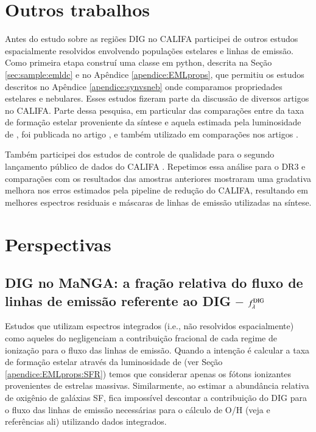\section{Outros trabalhos}
\label{sec:concl:other}

Antes do estudo sobre as regiões DIG no CALIFA participei de outros estudos espacialmente resolvidos envolvendo populações estelares e linhas de emissão. Como primeira etapa construí uma classe em {\sc python}, descrita na Seção  \ref{sec:sample:emldc} e no Apêndice \ref{apendice:EMLprops}, que permitiu os estudos descritos no Apêndice \ref{apendice:synvsneb} onde comparamos propriedades estelares e nebulares. Esses estudos fizeram parte da discussão de diversos artigos no CALIFA. Parte dessa pesquisa, em particular das comparações entre da taxa de formação estelar proveniente da síntese e aquela estimada pela luminosidade de \Ha, foi publicada no artigo \citep{GonzalezDelgado.etal.2016a}, e também utilizado em comparações nos artigos \citet{CortijoFerrero.etal.2017a, CortijoFerrero.etal.2017b, CortijoFerrero.etal.2017c}.

Também participei dos estudos de controle de qualidade para o segundo lançamento público de dados do CALIFA  \citet[DR2; ][Apêndice \ref{apendice:GBetal2015a}]{GarciaBenito.etal.2015a}. Repetimos essa análise para o DR3 e comparações com os resultados das amostras anteriores mostraram uma gradativa melhora nos erros estimados pela pipeline de redução do CALIFA, resultando em melhores espectros residuais e máscaras de linhas de emissão utilizadas na síntese.


\section{Perspectivas}
\label{sec:concl:futIFS}

\subsection{DIG no MaNGA: a fração relativa do fluxo de linhas de emissão referente ao DIG -- $f_\lambda^{\rm DIG}$}
\label{sec:concl:futIFS:DIGMaNGA}
Estudos que utilizam espectros integrados (i.e., não resolvidos espacialmente) como aqueles do \SDSS negligenciam a contribuição fracional de cada regime de ionização para o fluxo das linhas de emissão. Quando a intenção é calcular a taxa de formação estelar através da luminosidade de \Ha (ver Seção \ref{apendice:EMLprops:SFR}) temos que considerar apenas os fótons ionizantes provenientes de estrelas massivas. Similarmente, ao estimar a abundância relativa de oxigênio de galáxias SF, fica impossível descontar a contribuição do DIG para o fluxo das linhas de emissão necessárias para o cálculo de O/H (veja \citealt{Sanders.etal.2017a} e referências ali) utilizando dados integrados.

